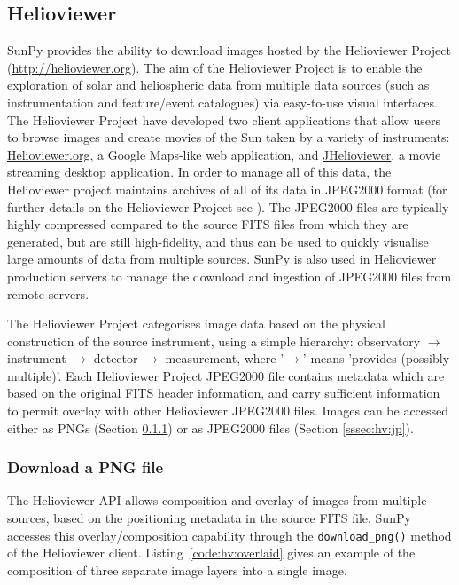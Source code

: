 \subsection{Helioviewer}\label{ssec:hv}

SunPy provides the ability to download images hosted by the
Helioviewer Project (\href{http://helioviewer.org}{http://helioviewer.org}).  
The aim of the Helioviewer Project is to enable
the exploration of solar and heliospheric data from multiple data
sources (such as instrumentation and feature/event catalogues) via
easy-to-use visual interfaces. The Helioviewer Project have developed two client 
applications that allow users to browse images and create movies of the Sun taken 
by a variety of instruments: \href{http://www.helioviewer.org}{Helioviewer.org}, a 
Google Maps-like web application, and \href{http://www.jhelioviewer.org}{JHelioviewer}, 
a movie streaming desktop application. In order to manage all of this data, the Helioviewer
project maintains archives of all of its data in JPEG2000 format (for further
details on the Helioviewer Project see \citealt{muller2009}). The
JPEG2000 files are typically highly compressed compared to the source
FITS files from which they are generated, but are still high-fidelity, and thus can be used to quickly
visualise large amounts of data from multiple sources.  SunPy is
also used in Helioviewer production servers to manage the download and
ingestion of JPEG2000 files from remote servers.

The Helioviewer Project categorises image data based on the physical
construction of the source instrument, using a simple hierarchy:
observatory $\rightarrow$ instrument $\rightarrow$ detector
$\rightarrow$ measurement, where '$\rightarrow$' means 'provides
(possibly multiple)'.  
Each Helioviewer Project JPEG2000 file contains
metadata which are based on the original FITS header
information, and carry sufficient information to permit overlay with
other Helioviewer JPEG2000 files. Images can be accessed either as
PNGs (Section \ref{sssec:hv:png}) or as JPEG2000 files (Section
\ref{sssec:hv:jp}).

\subsubsection{Download a PNG file}\label{sssec:hv:png}

The Helioviewer API allows composition and overlay of images from
multiple sources, based on the positioning metadata in the source FITS
file.  SunPy accesses this overlay/composition capability through the
\texttt{download\_png()} method of the Helioviewer client.  Listing~\ref{code:hv:overlaid}
gives an example of the composition of three
separate image layers into a single image.

